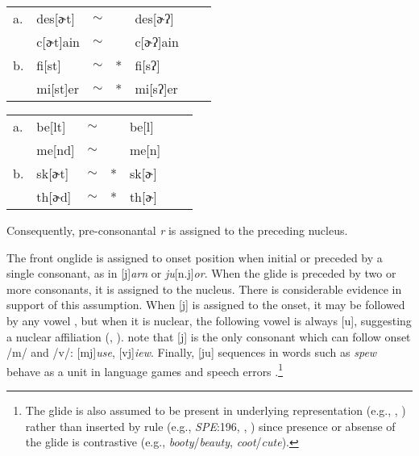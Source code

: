 \documentclass[12pt]{article}
\newcommand{\alt}{\ensuremath{\sim}}
\begin{document}
\begin{example}
\label{tglottalization}
\begin{tabular}{l l l l@{} l l l}
a. & {des}[ɚt]    & \alt{} &   & {des}[ɚʔ]    \\
   & {c}[ɚt]{ain} & \alt{} &   & {c}[ɚʔ]{ain} \\
b. & {fi}[st]     & \alt{} & * & {fi}[sʔ]     \\
   & {mi}[st]{er} & \alt{} & * & {mi}[sʔ]{er} \\
\end{tabular}
\end{example}

\begin{example}
\label{tddeletion}
\begin{tabular}{l l l l@{} l l l}
a. & {be}[lt] & \alt{} &   & {be}[l] \\
   & {me}[nd] & \alt{} &   & {me}[n] \\
b. & {sk}[ɚt] & \alt{} & * & {sk}[ɚ] \\
   & {th}[ɚd] & \alt{} & * & {th}[ɚ] \\
\end{tabular}
\end{example}

\noindent
Consequently, pre-consonantal \emph{r} is assigned to the preceding nucleus.

The front onglide is assigned to onset position when initial or preceded by a single consonant, as in [j]\emph{arn} or \emph{ju}[n.j]\emph{or}. When the glide is preceded by two or more consonants, it is assigned to the nucleus. There is considerable evidence in support of this assumption. When [j] is assigned to the onset, it may be followed by any vowel \citep[276]{Borowsky1986}, but when it is nuclear, the following vowel is always [u], suggesting a nuclear affiliation (\citealp[61f.]{Harris1994}, \citealp[232]{Hayes1980}). \citet[42]{Clements1983} note that [j] is the only consonant which can follow onset /m/ and /v/: [mj]\emph{use}, [vj]\emph{iew}. Finally, [ju] sequences in words such as \emph{spew} behave as a unit in language games \citep{Davis1995,Nevins2003} and speech errors \citep[130]{Shattuck-Hufnagel1986}.\footnote{The glide is also assumed to be present in underlying representation (e.g., \citealp{Anderson1988b}, \citealp[278]{Borowsky1986}) rather than inserted by rule (e.g., \emph{SPE}:196, \citealp[][89]{Halle1985a}, \citealp[][217]{McMahon1990}) since presence or absense of the glide is contrastive (e.g., \emph{booty}/\emph{beauty}, \emph{coot}/\emph{cute}).}
\end{document}
